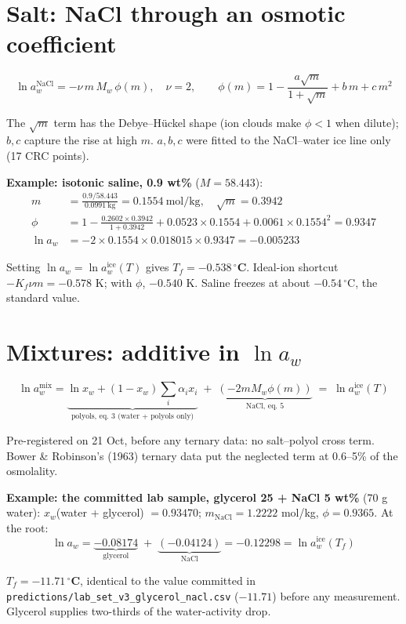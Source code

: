 \documentclass[11pt,a4paper]{article}
\newcommand{\file}[1]{\texttt{\small #1}}
\newcommand{\aice}{\ln a_w^{\mathrm{ice}}}
\begin{document}
\section{Salt: NaCl through an osmotic coefficient}
\begin{eqbox}
\[ \ln a_w^{\mathrm{NaCl}}=-\nu\, m\, M_w\,\phi(m),\quad \nu=2,\qquad
\phi(m)=1-\frac{a\sqrt m}{1+\sqrt m}+b\,m+c\,m^2 \tag{5}\]
\end{eqbox}
The $\sqrt m$ term has the Debye--H\"uckel shape (ion clouds make $\phi<1$ when dilute); $b,c$ capture the rise at high $m$.
$a,b,c$ were fitted to the NaCl--water ice line only (17 CRC points).

\textbf{Example: isotonic saline, 0.9 wt\%} ($M=58.443$):
\begin{align*}
m&=\frac{0.9/58.443}{0.0991\ \text{kg}}=0.1554\ \text{mol/kg},\quad \sqrt m=0.3942\\
\phi&=1-\frac{0.2602\times0.3942}{1+0.3942}+0.0523\times0.1554+0.0061\times0.1554^2=0.9347\\
\ln a_w&=-2\times0.1554\times0.018015\times0.9347=-0.005233
\end{align*}
\begin{result}
Setting $\ln a_w=\aice(T)$ gives $T_f=\mathbf{-0.538\,^\circ}$\textbf{C}. Ideal-ion shortcut $-K_f\nu m=-0.578$ K;
with $\phi$, $-0.540$ K. Saline freezes at about $-0.54\,^\circ$C, the standard value.
\end{result}

\section{Mixtures: additive in $\ln a_w$}
\begin{eqbox}
\[ \ln a_w^{\mathrm{mix}}=\underbrace{\ln x_w+(1-x_w)\textstyle\sum_i\alpha_ix_i}_{\text{polyols, eq. 3 (water + polyols only)}}
\;+\;\underbrace{\left(-2mM_w\phi(m)\right)}_{\text{NaCl, eq. 5}} \;=\;\aice(T)\tag{6}\]
\end{eqbox}
Pre-registered on 21 Oct, before any ternary data: no salt--polyol cross term. Bower \& Robinson's (1963) ternary data put the
neglected term at 0.6--5\% of the osmolality.

\textbf{Example: the committed lab sample, glycerol 25 + NaCl 5 wt\%} (70 g water):
$x_w$(water + glycerol) $=0.93470$; $m_{\text{NaCl}}=1.2222$ mol/kg, $\phi=0.9365$. At the root:
\[
\ln a_w=\underbrace{-0.08174}_{\text{glycerol}}\;+\;\underbrace{(-0.04124)}_{\text{NaCl}}=-0.12298=\aice(T_f)
\]
\begin{result}
$T_f=\mathbf{-11.71\,^\circ}$\textbf{C}, identical to the value committed in \file{predictions/lab\_set\_v3\_glycerol\_nacl.csv}
($-11.71$) before any measurement. Glycerol supplies two-thirds of the water-activity drop.
\end{result}
\end{document}
